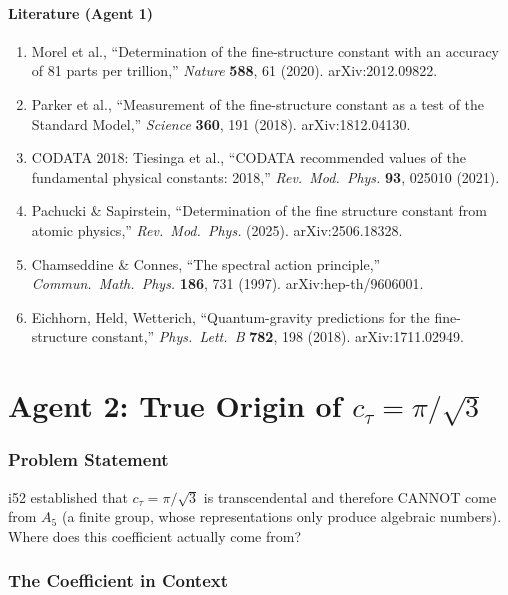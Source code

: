\documentclass[11pt,a4paper]{article}
\begin{document}
\subsection{Literature (Agent 1)}

\begin{enumerate}
\item Morel et al., ``Determination of the fine-structure constant with an accuracy of 81 parts per trillion,'' \textit{Nature} \textbf{588}, 61 (2020). arXiv:2012.09822.
\item Parker et al., ``Measurement of the fine-structure constant as a test of the Standard Model,'' \textit{Science} \textbf{360}, 191 (2018). arXiv:1812.04130.
\item CODATA 2018: Tiesinga et al., ``CODATA recommended values of the fundamental physical constants: 2018,'' \textit{Rev.\ Mod.\ Phys.} \textbf{93}, 025010 (2021).
\item Pachucki \& Sapirstein, ``Determination of the fine structure constant from atomic physics,'' \textit{Rev.\ Mod.\ Phys.} (2025). arXiv:2506.18328.
\item Chamseddine \& Connes, ``The spectral action principle,'' \textit{Commun.\ Math.\ Phys.} \textbf{186}, 731 (1997). arXiv:hep-th/9606001.
\item Eichhorn, Held, Wetterich, ``Quantum-gravity predictions for the fine-structure constant,'' \textit{Phys.\ Lett.\ B} \textbf{782}, 198 (2018). arXiv:1711.02949.
\end{enumerate}


\part{Agent 2: True Origin of $c_\tau = \pi/\sqrt{3}$}
\label{part:ctau}

\section{Problem Statement}

i52 established that $c_\tau = \pi/\sqrt{3}$ is transcendental and therefore CANNOT come from $A_5$ (a finite group, whose representations only produce algebraic numbers). Where does this coefficient actually come from?

\section{The Coefficient in Context}
\end{document}
